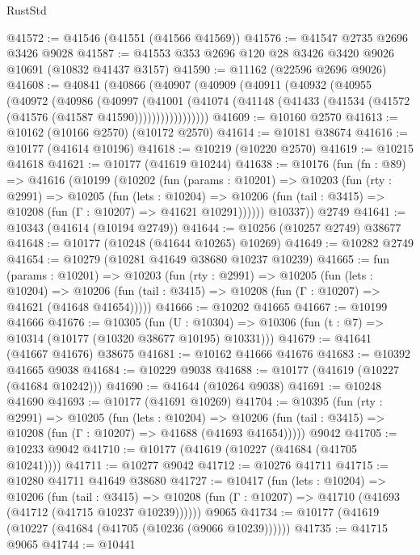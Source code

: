 \begin{lexlean}{RustStd}
\begin{coremodule}
@41572 := @41546 (@41551 (@41566 @41569))
@41576 := @41547 @2735 @2696 @3426 @9028
@41587 := @41553 @353 @2696 @120 @28 @3426 @3420 @9026 @10691 (@10832 @41437 @3157)
@41590 := @11162 (@22596 @2696 @9026)
@41608 := @40841
    (@40866
      (@40907
        (@40909
          (@40911
            (@40932
              (@40955
                (@40972
                  (@40986
                    (@40997
                      (@41001
                        (@41074
                          (@41148 (@41433 (@41534 (@41572 (@41576 (@41587 @41590)))))))))))))))))
@41609 := @10160 @2570
@41613 := @10162 (@10166 @2570) (@10172 @2570)
@41614 := @10181 @38674
@41616 := @10177 (@41614 @10196)
@41618 := @10219 (@10220 @2570)
@41619 := @10215 @41618
@41621 := @10177 (@41619 @10244)
@41638 := @10176
    (fun (fn : @89) =>
    @41616
      (@10199
        (@10202
          (fun (params : @10201) =>
          @10203
            (fun (rty : @2991) =>
            @10205
              (fun (lets : @10204) =>
              @10206 (fun (tail : @3415) => @10208 (fun (Γ : @10207) => @41621 @10291))))))
        @10337))
    @2749
@41641 := @10343 (@41614 (@10194 @2749))
@41644 := @10256 (@10257 @2749) @38677
@41648 := @10177 (@10248 (@41644 @10265) @10269)
@41649 := @10282 @2749
@41654 := @10279 (@10281 @41649 @38680 @10237 @10239)
@41665 := fun (params : @10201) =>
  @10203
    (fun (rty : @2991) =>
    @10205
      (fun (lets : @10204) =>
      @10206 (fun (tail : @3415) => @10208 (fun (Γ : @10207) => @41621 (@41648 @41654)))))
@41666 := @10202 @41665
@41667 := @10199 @41666
@41676 := @10305
    (fun (U : @10304) => @10306 (fun (t : @7) => @10314 (@10177 (@10320 @38677 @10195) @10331)))
@41679 := @41641 (@41667 @41676) @38675
@41681 := @10162 @41666 @41676
@41683 := @10392 @41665 @9038
@41684 := @10229 @9038
@41688 := @10177 (@41619 (@10227 (@41684 @10242)))
@41690 := @41644 (@10264 @9038)
@41691 := @10248 @41690
@41693 := @10177 (@41691 @10269)
@41704 := @10395
    (fun (rty : @2991) =>
    @10205
      (fun (lets : @10204) =>
      @10206 (fun (tail : @3415) => @10208 (fun (Γ : @10207) => @41688 (@41693 @41654)))))
    @9042
@41705 := @10233 @9042
@41710 := @10177 (@41619 (@10227 (@41684 (@41705 @10241))))
@41711 := @10277 @9042
@41712 := @10276 @41711
@41715 := @10280 @41711 @41649 @38680
@41727 := @10417
    (fun (lets : @10204) =>
    @10206
      (fun (tail : @3415) =>
      @10208 (fun (Γ : @10207) => @41710 (@41693 (@41712 (@41715 @10237 @10239))))))
    @9065
@41734 := @10177 (@41619 (@10227 (@41684 (@41705 (@10236 (@9066 @10239))))))
@41735 := @41715 @9065
@41744 := @10441

\end{coremodule}
\end{lexlean}

